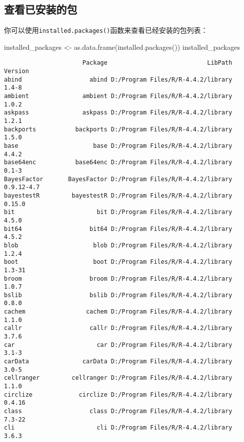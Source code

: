 \documentclass[
  letterpaper,
  DIV=11,
  numbers=noendperiod]{scrreprt}
\newenvironment{Shaded}{\begin{snugshade}}{\end{snugshade}}
\newcommand{\FunctionTok}[1]{\textcolor[rgb]{0.28,0.35,0.67}{#1}}
\newcommand{\NormalTok}[1]{\textcolor[rgb]{0.00,0.23,0.31}{#1}}
\newcommand{\OtherTok}[1]{\textcolor[rgb]{0.00,0.23,0.31}{#1}}
\begin{document}
\subsection{查看已安装的包}\label{ux67e5ux770bux5df2ux5b89ux88c5ux7684ux5305}

你可以使用\texttt{installed.packages()}函数来查看已经安装的包列表：

\begin{Shaded}
\begin{Highlighting}[]
\NormalTok{installed\_packages }\OtherTok{\textless{}{-}} \FunctionTok{as.data.frame}\NormalTok{(}\FunctionTok{installed.packages}\NormalTok{())}
\NormalTok{installed\_packages}
\end{Highlighting}
\end{Shaded}

\begin{verbatim}
                      Package                            LibPath    Version
abind                   abind D:/Program Files/R/R-4.4.2/library      1.4-8
ambient               ambient D:/Program Files/R/R-4.4.2/library      1.0.2
askpass               askpass D:/Program Files/R/R-4.4.2/library      1.2.1
backports           backports D:/Program Files/R/R-4.4.2/library      1.5.0
base                     base D:/Program Files/R/R-4.4.2/library      4.4.2
base64enc           base64enc D:/Program Files/R/R-4.4.2/library      0.1-3
BayesFactor       BayesFactor D:/Program Files/R/R-4.4.2/library 0.9.12-4.7
bayestestR         bayestestR D:/Program Files/R/R-4.4.2/library     0.15.0
bit                       bit D:/Program Files/R/R-4.4.2/library      4.5.0
bit64                   bit64 D:/Program Files/R/R-4.4.2/library      4.5.2
blob                     blob D:/Program Files/R/R-4.4.2/library      1.2.4
boot                     boot D:/Program Files/R/R-4.4.2/library     1.3-31
broom                   broom D:/Program Files/R/R-4.4.2/library      1.0.7
bslib                   bslib D:/Program Files/R/R-4.4.2/library      0.8.0
cachem                 cachem D:/Program Files/R/R-4.4.2/library      1.1.0
callr                   callr D:/Program Files/R/R-4.4.2/library      3.7.6
car                       car D:/Program Files/R/R-4.4.2/library      3.1-3
carData               carData D:/Program Files/R/R-4.4.2/library      3.0-5
cellranger         cellranger D:/Program Files/R/R-4.4.2/library      1.1.0
circlize             circlize D:/Program Files/R/R-4.4.2/library     0.4.16
class                   class D:/Program Files/R/R-4.4.2/library     7.3-22
cli                       cli D:/Program Files/R/R-4.4.2/library      3.6.3

\end{verbatim}
\end{document}
